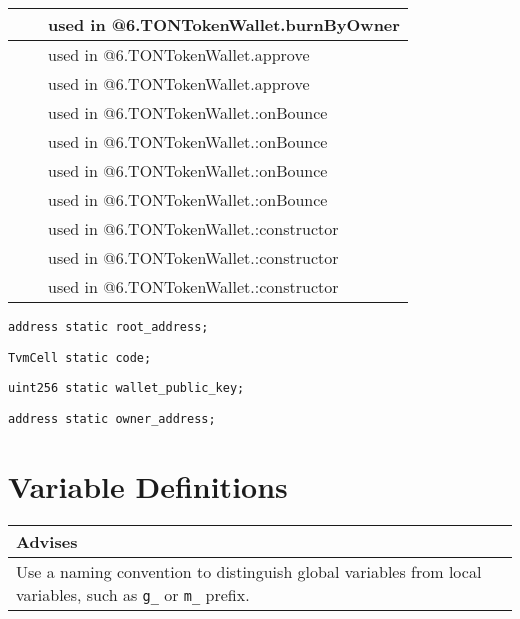 \begin{tabular}{|l|l|p{5cm}|}
 & & used in @6.TONTokenWallet.burnByOwner\\\hline
 & & used in @6.TONTokenWallet.approve\\\hline
 & & used in @6.TONTokenWallet.approve\\\hline
 & & used in @6.TONTokenWallet.:onBounce\\\hline
 & & used in @6.TONTokenWallet.:onBounce\\\hline
 & & used in @6.TONTokenWallet.:onBounce\\\hline
 & & used in @6.TONTokenWallet.:onBounce\\\hline
 & & used in @6.TONTokenWallet.:constructor\\\hline
 & & used in @6.TONTokenWallet.:constructor\\\hline
 & & used in @6.TONTokenWallet.:constructor\\\hline
\end{tabular}
\fi


\begin{lstlisting}[firstnumber=24]
    address static root_address;
\end{lstlisting}

\begin{lstlisting}[firstnumber=25]
    TvmCell static code;
\end{lstlisting}

\begin{lstlisting}[firstnumber=27]
    uint256 static wallet_public_key;
\end{lstlisting}

\begin{lstlisting}[firstnumber=29]
    address static owner_address;
\end{lstlisting}

\section{Variable Definitions}


\ifsoldraft
\noindent\begin{tabular}{|p{12cm}|}\hline
\rowcolor{green}Advises
\\\hline
Use a naming convention to distinguish global variables from local variables, such as \verb+g_+ or \verb+m_+ prefix.
\\\hline\end{tabular}
\fi


